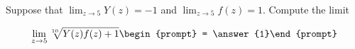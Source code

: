 \documentclass{ximera}
\author{Matthew Carr}
\begin{document}
\begin{exercise}
Suppose that $\lim_{z\to5}Y(z)=-1$ and $\lim_{z\to5}f(z)=1$. Compute the limit

\[
\lim_{z\to 5 } \sqrt[10]{Y(z)f(z)+1}\begin{prompt} = \answer{1}\end{prompt}
\]
\end{exercise}
\end{document}
